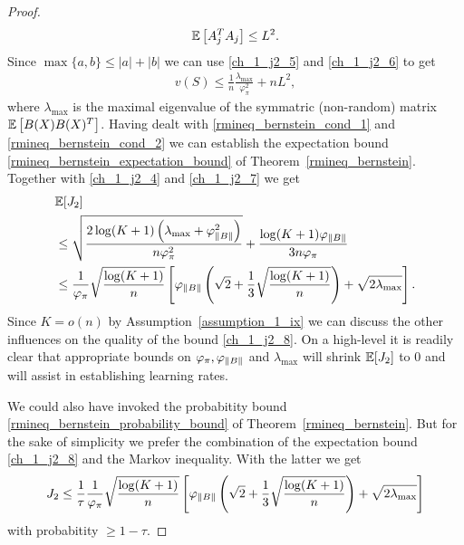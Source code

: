 \begin{proof}
\begin{gather}
  \label{ch_1_j2_6}
  \mathbb{E}
  \left[ 
    A_j^T A_j
  \right]
  \le
  L^2.
\end{gather}
Since 
$
  \max\{a,b\}
  \le
  | a | + | b |
$
we can use 
\eqref{ch_1_j2_5}
and
\eqref{ch_1_j2_6}
to get
\begin{gather}
  \label{ch_1_j2_7}
  v(S)
  \le
  \frac{1}{n}
  \frac{\lambda_{\max}}{\varphi_{\pi}^2}
  +
  n L^2,
\end{gather}
where 
$\lambda_{\max}$ 
is the maximal eigenvalue of
the symmatric (non-random) matrix
$
  \mathbb{E}
  \left[ 
    B(X) B(X)^T
  \right]
$.
Having dealt with 
\eqref{rmineq_bernstein_cond_1} 
and
\eqref{rmineq_bernstein_cond_2}
we can establish 
the
expectation bound
\eqref{rmineq_bernstein_expectation_bound}
of Theorem~\ref{rmineq_bernstein}.
Together with 
\eqref{ch_1_j2_4}
and
\eqref{ch_1_j2_7}
we get
\begin{align}
  \label{ch_1_j2_8}
  \begin{split}
    &\mathbb{E}[J_2]
\\
  &\le
  \sqrt{
    \frac{
    2 \log (K + 1)
    \left( 
      \lambda_{\max}  + \varphi_{\left\lVert B\right\rVert}^2
    \right)
    }
    {
      n \varphi_{\pi}^2
    }
  }
  +
  \frac{
    \log (K + 1)
    \varphi_{\left\lVert B\right\rVert}
  }
  {
    3 n \varphi_{\pi}
  }
\\
  &\le
  \frac{1}{\varphi_{\pi}}
  \sqrt{
    \frac{
      \log(K + 1)
    }
    {
      n
    }
  }
  \left[
    \varphi_{\left\lVert B\right\rVert}
    \left(
      \sqrt{2}
      +
      \frac{1}{3}
      \sqrt{
        \frac{\log (K + 1)}{n}
      }
    \right)
    +
    \sqrt{
      2
      \lambda_{\max}
    }
  \right].
\end{split}
\end{align}
Since
$
  K = o(n)
$
by Assumption~\ref{assumption_1_ix}
we can discuss the other influences on the quality of the bound
\eqref{ch_1_j2_8}.
On a high-level it is readily clear
that appropriate bounds on
$
\varphi_{\pi},
\varphi_{\left\lVert B\right\rVert}
$
and
$
  \lambda_{\max}
$
will shrink
$
  \mathbb{E}[J_2]
$
to 0 
and will assist in establishing learning rates.

We could also have invoked the probabitity bound 
\eqref{rmineq_bernstein_probability_bound} 
of Theorem~\ref{rmineq_bernstein}.
But for the sake of simplicity we prefer the combination 
of the expectation bound 
\eqref{ch_1_j2_8}
and the Markov inequality.
With the latter we get
\begin{align}
  \label{ch_1_j2_result}
  J_2
  \le
  \frac{1}{\tau}
  \frac{1}{\varphi_{\pi}}
  \sqrt{
    \frac{
      \log(K + 1)
    }
    {
      n
    }
  }
  \left[
    \varphi_{\left\lVert B\right\rVert}
    \left(
      \sqrt{2}
      +
      \frac{1}{3}
      \sqrt{
        \frac{\log (K + 1)}{n}
      }
    \right)
    +
    \sqrt{
      2
      \lambda_{\max}
    }
  \right]
\end{align}
with probabitity 
$
  \ge
  1 - \tau
$.


\end{proof}

